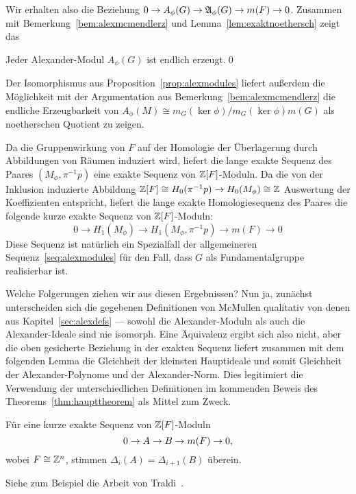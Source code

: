 Wir erhalten also die Beziehung $0\to A_\phi(G)\to\mathfrak A_\phi(G)\to m(F)\to0$. Zusammen mit Bemerkung~\ref{bem:alexmcmendlerz} und Lemma~\ref{lem:exaktnoethersch} zeigt das
	
\begin{cor}
\label{cor:alexendlerz}
		Jeder Alexander-Modul $A_\phi(G)$ ist endlich erzeugt.\qed 
\end{cor}
\begin{bem}
	Der Isomorphismus aus Proposition~\ref{prop:alexmodules} liefert außerdem die Möglichkeit mit der Argumentation aus Bemerkung~\ref{bem:alexmcmendlerz} die endliche Erzeugbarkeit von $A_\phi(M)\cong m_G(\ker\phi)/m_G(\ker\phi)m(G)$ als noetherschen Quotient zu zeigen.
\end{bem}

Da die Gruppenwirkung von $F$ auf der Homologie der Überlagerung durch Abbildungen von Räumen induziert wird, liefert die lange exakte Sequenz des Paares $(M_\phi,\pi^{-1} p)$ eine exakte Sequenz von $\mathbb{Z}[F]$-Moduln. Da die von der Inklusion induzierte Abbildung $\mathbb{Z}[F]\cong H_0(\pi^{-1} p) \to H_0 (M_\phi) \cong \mathbb{Z}$ Auswertung der Koeffizienten entspricht, liefert die lange exakte Homologiesequenz des Paares die folgende kurze exakte Sequenz von $\mathbb{Z}[F]$-Moduln:
	\begin{equation}
	0 \to H_1(M_\phi) \to H_1(M_\phi,\pi^{-1} p ) \to m(F) \to 0 \label{seq:leshomology}
	\end{equation}
Diese Sequenz ist natürlich ein Spezialfall der allgemeineren Sequenz~\eqref{seq:alexmodules} für den Fall, dass $G$ als Fundamentalgruppe realisierbar ist.

Welche Folgerungen ziehen wir aus diesen Ergebnissen? Nun ja, zunächst unterscheiden sich die gegebenen Definitionen von McMullen qualitativ von denen aus Kapitel~\ref{sec:alexdefs} --- sowohl die Alexander-Moduln als auch die Alexander-Ideale sind nie isomorph. Eine Äquivalenz ergibt sich also nicht, aber die oben gesicherte Beziehung in der exakten Sequenz liefert zusammen mit dem folgenden Lemma die Gleichheit der kleinsten Hauptideale und somit Gleichheit der Alexander-Polynome und der Alexander-Norm. Dies legitimiert die Verwendung der unterschiedlichen Definitionen im kommenden Beweis des Theorems~\ref{thm:haupttheorem} als Mittel zum Zweck.

\begin{lem}
 	Für eine kurze exakte Sequenz von $\mathbb{Z}[F]$-Moduln
 	\[
 	 	0\to A\to B\to m(F)\to0,
 	 \] wobei $F\cong \mathbb{Z}^n$, stimmen $\Delta_i(A)=\Delta_{i+1}(B)$ überein. 
 \end{lem} 
 Siehe zum Beispiel die Arbeit von Traldi~\cite{Traldi.1982}.


